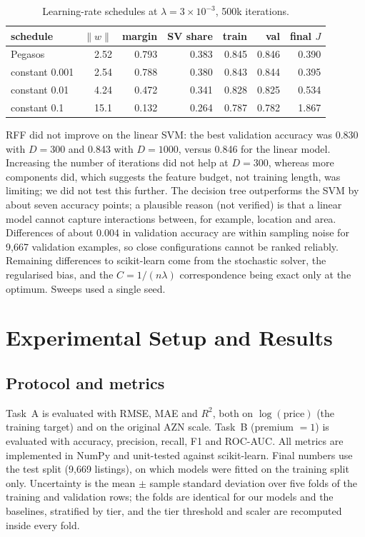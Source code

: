\documentclass[10pt,twocolumn,a4paper]{article}
\begin{document}
\begin{table}[t]
  \centering
  \footnotesize
  \caption{Learning-rate schedules at $\lambda=3\times10^{-3}$, 500k iterations.}
  \label{tab:svm_lr}
  \begin{tabular}{@{}lrrrrrr@{}}
    \toprule
    schedule & $\lVert w\rVert$ & margin & SV share & train & val & final $J$ \\
    \midrule
    Pegasos & 2.52 & 0.793 & 0.383 & 0.845 & 0.846 & 0.390 \\
    constant 0.001 & 2.54 & 0.788 & 0.380 & 0.843 & 0.844 & 0.395 \\
    constant 0.01 & 4.24 & 0.472 & 0.341 & 0.828 & 0.825 & 0.534 \\
    constant 0.1 & 15.1 & 0.132 & 0.264 & 0.787 & 0.782 & 1.867 \\
    \bottomrule
  \end{tabular}
\end{table}

RFF did not improve on the linear SVM: the best validation accuracy was 0.830
with $D=300$ and 0.843 with $D=1000$, versus 0.846 for the linear model.
Increasing the number of iterations did not help at $D=300$, whereas more
components did, which suggests the feature budget, not training length, was
limiting; we did not test this further. The decision tree outperforms the
SVM by about seven accuracy points; a plausible reason (not verified) is that
a linear model cannot capture interactions between, for example, location
and area. Differences of about 0.004 in validation accuracy are within
sampling noise for 9{,}667 validation examples, so close configurations
cannot be ranked reliably. Remaining differences to scikit-learn come from
the stochastic solver, the regularised bias, and the $C=1/(n\lambda)$
correspondence being exact only at the optimum. Sweeps used a single seed.


\section{Experimental Setup and Results}
\subsection{Protocol and metrics}
Task~A is evaluated with RMSE, MAE and $R^2$, both on $\log(\text{price})$
(the training target) and on the original AZN scale. Task~B (premium $=1$) is
evaluated with accuracy, precision, recall, F1 and ROC-AUC. All metrics are
implemented in NumPy and unit-tested against scikit-learn. Final numbers use
the test split (9{,}669 listings), on which models were fitted on the training
split only. Uncertainty is the mean $\pm$ sample standard deviation over five
folds of the training and validation rows; the folds are identical for our
models and the baselines, stratified by tier, and the tier threshold and
scaler are recomputed inside every fold.
\end{document}
